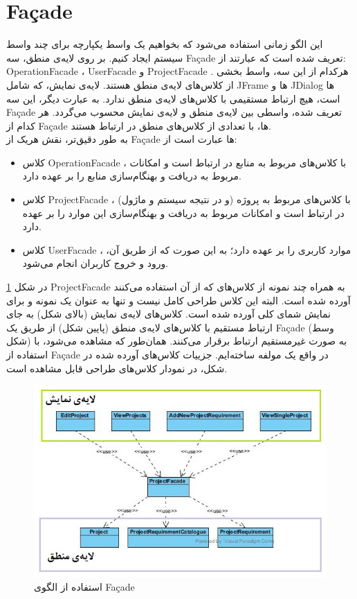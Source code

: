\newpage
\section{Façade}
این الگو زمانی استفاده می‌شود که بخواهیم یک واسط یکپارچه برای چند واسط سیستم ایجاد کنیم. بر روی لایه‌ی منطق، سه Façade تعریف شده است که عبارتند از: OperationFacade ،‌ UserFacade و ProjectFacade . هرکدام از این سه، واسط بخشی از کلاس‌های لایه‌ی منطق هستند. لایه‌ی نمایش، که شامل JFrame‌ ها و JDialog ها است، هیچ ارتباط مستقیمی با کلاس‌های لایه‌ی منطق ندارد. به عبارت دیگر، این سه Façade تعریف شده، واسطی بین لایه‌ی منطق و لایه‌ی نمایش محسوب می‌گردد. هر کدام از Façade ها، با تعدادی از کلاس‌های منطق در ارتباط هستند.\\
به طور دقیق‌تر، نقش هریک از  Façade ها عبارت است از:
\begin{itemize}
\item
کلاس OperationFacade ، با کلاس‌های مربوط به منابع در ارتباط است و امکانات مربوط به دریافت و بهنگام‌سازی منابع را بر عهده دارد.
\item
کلاس ProjectFacade ، با کلاس‌های مربوط به پروژه (و در نتیجه سیستم و ماژول) در ارتباط است و امکانات مربوط به دریافت و بهنگام‌سازی این موارد را بر عهده دارد.
\item
کلاس UserFacade ، موارد کاربری را بر عهده دارد؛ به این صورت که از طریق آن، ورود و خروج کاربران انجام می‌شود.
\end{itemize}

در شکل 
\ref{f203}
ProjectFacade
به همراه چند نمونه از کلاس‌های که از آن استفاده می‌کنند آورده شده است.  البته این کلاس طراحی کامل نیست و تنها به عنوان یک نمونه‌ و برای نمایش شمای کلی آورده شده است. کلاس‌های لایه‌ی نمایش (بالای شکل) به جای ارتباط مستقیم با کلاس‌های لایه‌ی منطق (پایین شکل) از طریق یک Façade (وسط شکل) به صورت غیرمستقیم ارتباط برقرار می‌کنند. همان‌طور که مشاهده می‌شود، با استفاده از  Façade در واقع یک مولفه
 ساخته‌ایم. جزییات کلاس‌های آورده شده در شکل، در نمودار کلاس‌های طراحی قابل مشاهده است.

\begin{figure}[H]
	\centering
	\includegraphics[scale=0.6]{img/pattern/facade}
	\caption{  استفاده از الگوی Façade}
	\label{f203}
\end{figure}
